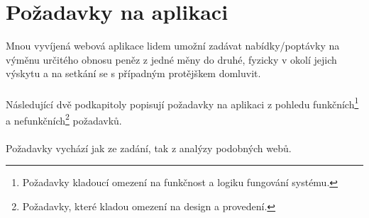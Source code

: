 \chapter{Požadavky na aplikaci}
\label{requirements}

Mnou vyvíjená webová aplikace lidem umožní zadávat nabídky/poptávky na výměnu určitého obnosu peněz z jedné měny do druhé, fyzicky v okolí jejich výskytu a na setkání se s případným protějškem domluvit.
\\\\
Následující dvě podkapitoly popisují požadavky na aplikaci z pohledu funkčních\footnote{Požadavky kladoucí omezení na funkčnost a logiku fungování systému.} a nefunkčních\footnote{Požadavky, které kladou omezení na design a provedení.} požadavků.
\\\\
Požadavky vychází jak ze zadání, tak z analýzy podobných webů.
